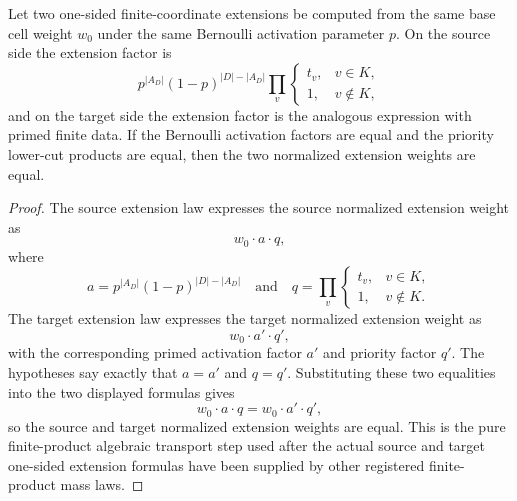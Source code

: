 \begin{helper}
Let two one-sided finite-coordinate extensions be computed from the same base
cell weight \(w_0\) under the same Bernoulli activation parameter \(p\).  On
the source side the extension factor is
\[
  p^{|A_D|}(1-p)^{|D|-|A_D|}
  \prod_v \begin{cases}t_v,&v\in K,\\1,&v\notin K,\end{cases}
\]
and on the target side the extension factor is the analogous expression with
primed finite data.  If the Bernoulli activation factors are equal and the
priority lower-cut products are equal, then the two normalized extension
weights are equal.
\end{helper}
\begin{proof}
The source extension law expresses the source normalized extension weight as
\[
  w_0\cdot a\cdot q,
\]
where
\[
  a=p^{|A_D|}(1-p)^{|D|-|A_D|}
  \quad\text{and}\quad
  q=\prod_v \begin{cases}t_v,&v\in K,\\1,&v\notin K.\end{cases}
\]
The target extension law expresses the target normalized extension weight as
\[
  w_0\cdot a'\cdot q',
\]
with the corresponding primed activation factor \(a'\) and priority factor
\(q'\).  The hypotheses say exactly that \(a=a'\) and \(q=q'\).  Substituting
these two equalities into the two displayed formulas gives
\[
  w_0\cdot a\cdot q=w_0\cdot a'\cdot q',
\]
so the source and target normalized extension weights are equal.  This is the
pure finite-product algebraic transport step used after the actual source and
target one-sided extension formulas have been supplied by other registered
finite-product mass laws.
\end{proof}
